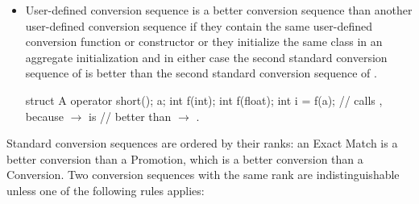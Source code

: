 \begin{itemize}
\begin{itemize}
\begin{example}
\begin{codeblock}
int i;
int j = f(i);                   // calls 
int k = g(i);                   // ambiguous

struct X {
  void f() const;
  void f();
};
void g(const X& a, X b) {
  a.f();                        // calls 
  b.f();                        // calls 
}
\end{codeblock}
\end{example}
\end{itemize}

\item
User-defined conversion sequence
is a better conversion sequence than another user-defined conversion
sequence
if they contain the same user-defined conversion function or
constructor or they initialize the same class in an aggregate
initialization and in either case the second standard conversion
sequence of
is better than
the second standard conversion sequence of
.
\begin{example}

\begin{codeblock}
struct A {
  operator short();
} a;
int f(int);
int f(float);
int i = f(a);                   // calls , because  $\to$  is
                                // better than  $\to$ .
\end{codeblock}
\end{example}

\end{itemize}

\pnum
Standard conversion sequences are ordered by their ranks: an Exact Match is a
better conversion than a Promotion, which is a better conversion than
a Conversion.
Two conversion sequences with the same rank are indistinguishable unless
one of the following rules applies:


